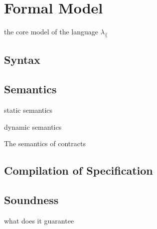 \section{Formal Model}
\label{sec:model}

the core model of the language $\lambda_\lang$

\subsection{Syntax}



\subsection{Semantics}

static semantics

dynamic semantics

The semantics of contracts

\subsection{Compilation of Specification}

\subsection{Soundness}

what does it guarantee

